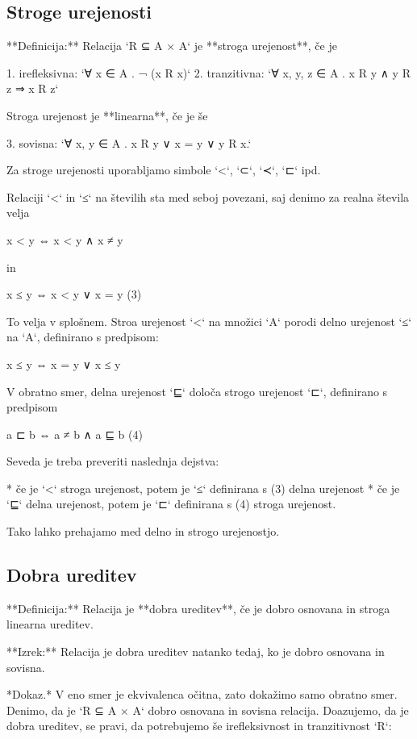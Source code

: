 \subsection{Stroge urejenosti}

**Definicija:** Relacija `R ⊆ A × A` je **stroga urejenost**, če je

1. irefleksivna: `∀ x ∈ A . ¬ (x R x)`
2. tranzitivna: `∀ x, y, z ∈ A . x R y ∧ y R z ⇒ x R z`

Stroga urejenost je **linearna**, če je še

3. sovisna: `∀ x, y ∈ A . x R y ∨ x = y ∨ y R x.`

Za stroge urejenosti uporabljamo simbole `<`, `⊂`, `≺`, `⊏` ipd.

Relaciji `<` in `≤` na številih sta med seboj povezani, saj denimo za realna števila velja

    x < y ⇔ x < y ∧ x ≠ y

in

    x ≤ y ⇔ x < y ∨ x = y            (3)

To velja v splošnem. Stroa urejenost `<` na množici `A` porodi delno urejenost `≤` na `A`,
definirano s predpisom:

    x ≤ y  ⇔  x = y ∨ x ≤ y

V obratno smer, delna urejenost `⊑` določa strogo urejenost `⊏`, definirano s predpisom

    a ⊏ b  ⇔  a ≠ b ∧ a ⊑ b         (4)

Seveda je treba preveriti naslednja dejstva:

* če je `<` stroga urejenost, potem je `≤` definirana s (3) delna urejenost
* če je `⊑` delna urejenost, potem je `⊏` definirana s (4) stroga urejenost.

Tako lahko prehajamo med delno in strogo urejenostjo.

\subsection{Dobra ureditev}

**Definicija:** Relacija je **dobra ureditev**, če je dobro osnovana in stroga linearna ureditev.

**Izrek:** Relacija je dobra ureditev natanko tedaj, ko je dobro osnovana in sovisna.

*Dokaz.* V eno smer je ekvivalenca očitna, zato dokažimo samo obratno smer. Denimo, da je
`R ⊆ A × A` dobro osnovana in sovisna relacija. Doazujemo, da je dobra ureditev, se pravi,
da potrebujemo še irefleksivnost in tranzitivnost `R`:

